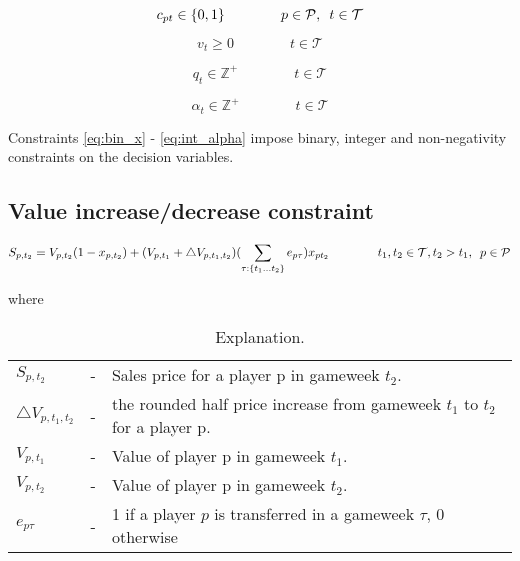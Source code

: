 \begin{equation} \label{eq:triple_captain_bin_c}
    c_{pt} \in \{0,1\} \qquad\qquad p \in \mathcal{P}, \enskip t \in \mathcal{T} 
\end{equation}

\begin{equation} \label{eq:nonn_v}
    v_{t} \geq 0 \qquad\qquad t \in \mathcal{T} 
\end{equation}

\begin{equation} \label{eq:int_q}
    q_{t} \in \mathbb{Z}^{+}  \qquad\qquad t \in \mathcal{T}
\end{equation}

\begin{equation} \label{eq:int_alpha}
    \alpha_{t} \in \mathbb{Z}^{+}  \qquad\qquad t \in \mathcal{T}
\end{equation}

Constraints \eqref{eq:bin_x} - \eqref{eq:int_alpha} impose binary, integer and non-negativity constraints on the decision variables.

\newpage

\subsection{Value increase/decrease constraint}

\begin{equation*}
    S_{p,t_{2}} = V_{p,t_{2}}(1-x_{p,t_{2}}) + (V_{p,t_{1}} + \triangle V_{p,t_{1},t_{2}}) (\sum_{\tau:\{ t_{1} \dots t_{2}\}} e_{p\tau}) x_{pt_{2}} \qquad\qquad t_{1}, t_{2} \in \mathcal{T}, t_{2} > t_{1}, \enskip p \in \mathcal{P}
\end{equation*}

where 


\begin{table}[H]
\centering
\caption{Explanation.}
\begin{tabular}{@{}lll@{}}
\toprule
$S_{p,t_{2}}$ & - & Sales price for a player p in gameweek $t_{2}$.\\
$\triangle V_{p,t_{1},t_{2}}$  & - & the rounded half price increase from gameweek $t_{1}$ to $t_{2}$ for a player p. \\ 
$V_{p,t_{1}}$   & - & Value of player p in gameweek $t_{1}$.                                             \\
$V_{p,t_{2}}$   & - & Value of player p in gameweek $t_{2}$.                                             \\
$e_{p\tau}$     & - & 1 if a player $p$ is transferred in a gameweek $\tau$, 0 otherwise                  \\
\bottomrule
\end{tabular}
\end{table}

